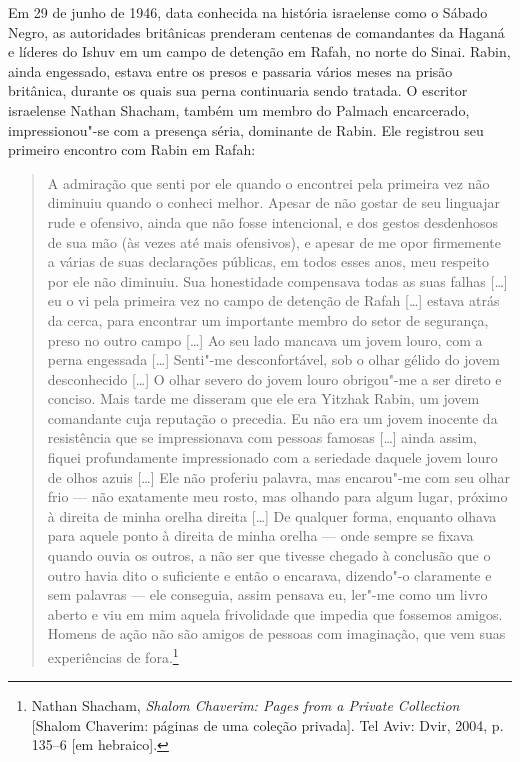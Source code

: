 Em 29 de junho de 1946, data conhecida na história israelense como o Sábado
Negro, as autoridades britânicas prenderam centenas de comandantes da
Haganá e líderes do Ishuv em um campo de detenção em Rafah, no norte do
Sinai. Rabin, ainda engessado, estava entre os presos e passaria vários
meses na prisão britânica, durante os quais sua perna continuaria sendo
tratada. O escritor israelense Nathan Shacham, também um membro do Palmach
encarcerado, impressionou"-se com a presença séria, dominante de Rabin. Ele
registrou seu primeiro encontro com Rabin em Rafah:

\begin{quote}
A admiração que senti por ele quando o encontrei pela primeira vez não
diminuiu quando o conheci melhor. Apesar de não gostar de seu linguajar
rude e ofensivo, ainda que não fosse intencional, e dos gestos desdenhosos de
sua mão (às vezes até mais ofensivos), e apesar de me opor firmemente a
várias de suas declarações públicas, em todos esses anos, meu respeito
por ele não diminuiu. Sua honestidade compensava todas as suas falhas {[}\ldots{}{]}
eu o vi pela primeira vez no campo de detenção de Rafah {[}\ldots{}{]} estava atrás
da cerca, para encontrar um importante membro do setor de segurança,
preso no outro campo {[}\ldots{}{]} Ao seu lado mancava um jovem louro, com a perna
engessada {[}\ldots{}{]} Senti"-me desconfortável, sob o olhar gélido do jovem
desconhecido {[}\ldots{}{]} O olhar severo do jovem louro obrigou"-me a ser direto e
conciso. Mais tarde me disseram que ele era Yitzhak Rabin, um jovem
comandante cuja reputação o precedia. Eu não era um jovem inocente da
resistência que se impressionava com pessoas famosas {[}\ldots{}{]} ainda assim,
fiquei profundamente impressionado com a seriedade daquele jovem louro
de olhos azuis {[}\ldots{}{]} Ele não proferiu palavra, mas encarou"-me com seu olhar
frio --- não exatamente meu rosto, mas olhando para algum lugar, próximo
à direita de minha orelha direita {[}\ldots{}{]} De qualquer forma, enquanto olhava
para aquele ponto à direita de minha orelha --- onde sempre se fixava
quando ouvia os outros, a não ser que tivesse chegado à conclusão que o
outro havia dito o suficiente e então o encarava, dizendo"-o claramente e
sem palavras --- ele conseguia, assim pensava eu, ler"-me como um livro
aberto e viu em mim aquela frivolidade que impedia que fossemos amigos.
Homens de ação não são amigos de pessoas com imaginação, que vem suas
experiências de fora.\footnote{Nathan Shacham, \emph{Shalom Chaverim: Pages from a Private Collection} {[Shalom Chaverim: páginas de uma coleção privada]}. Tel Aviv: Dvir, 2004, p. 135--6 {[}em hebraico{]}.}
\end{quote}

